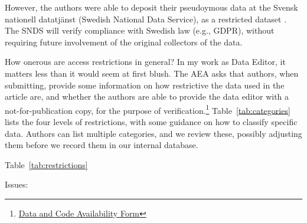 \documentclass{article}
\begin{document}
%
%
However, the authors were able to deposit their pseudoymous data at the Svensk nationell datatjänst (Swedish National Data Service), as a restricted dataset \citep{ahrsjo_data_2023}. The SNDS will verify compliance with Swedish law (e.g., \ac{GDPR}), without requiring future involvement of the original collectors of the data. 

How onerous are access restrictions in general? In my work as Data Editor, it matters less than it would seem at first blush. The AEA asks that authors, when submitting, provide some information on how restrictive the data used in the article are, and whether the authors are able to provide the data editor with a not-for-publication copy, for the purpose of verification.\footnote{\href{https://www.aeaweb.org/journals/forms/data-code-availability}{Data and Code Availability Form}} Table~\ref{tab:categories} lists the four levels of restrictions, with some guidance on how to classify specific data. Authors can list multiple categories, and we review these, possibly adjusting them before we record them in our internal database. 



Table~\ref{tab:restrictions}




Issues:
\end{document}
